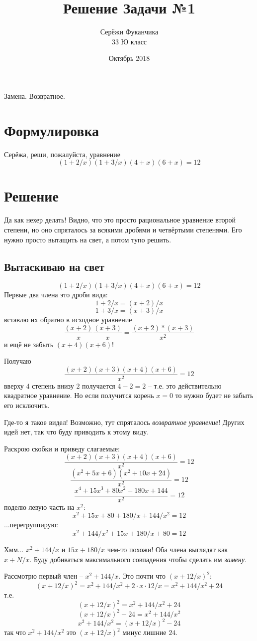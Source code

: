 \documentclass{article}
\title{Решение Задачи №1}
\author{Серёжи Фуканчика\\33 Ю класс}
\date{Октябрь 2018}
\begin{document}
\maketitle
Замена. Возвратное.
\section{Формулировка}
Серёжа, реши, пожалуйста, уравнение
$$(1+2/x)(1+3/x)(4+x)(6+x)=12$$

\section{Решение}

Да как нехер делать! Видно, что это просто рациональное уравнение второй степени, но оно спряталось за всякими дробями и четвёртыми степенями. Его нужно просто вытащить на свет, а потом тупо решить.

\subsection{Вытаскиваю на свет}
$$(1+2/x)(1+3/x)(4+x)(6+x)=12$$
Первые два члена это дроби вида:
$$1+2/x = (x+2)/x$$
$$1+3/x = (x+3)/x$$
вставлю их обратно в исходное уравнение
$$\frac{(x+2)}{x}\frac{(x+3)}{x}=\frac{(x+2)*(x+3)}{x^2}$$
и ещё не забыть $(x+4)(x+6)$!

Получаю
$$\frac{(x+2)(x+3)(x+4)(x+6)}{x^2}=12$$
вверху $4$ степень внизу $2$ получается $4-2=2$ -- т.е. это действительно квадратное уравнение.
Но если получится корень $x=0$ то нужно будет не забыть его исключить.

Где-то я такое видел! Возможно, тут спряталось \textit{возвратное уравнение}! Других идей нет, так что буду приводить к этому виду.

\begin{samepage}
Раскрою скобки и приведу слагаемые:
$$\frac{(x+2)(x+3)(x+4)(x+6)}{x^2}=12$$
$$\frac{(x^2+5x+6)(x^2+10x+24)}{x^2}=12$$
$$ \frac{x^4+15x^3+80x^2+180x+144}{x^2}=12 $$
поделю левую часть на $x^2$:
$$ x^2+15x+80+180/x+144/x^2=12 $$
...перегруппирую:
$$ x^2+144/x^2+15x+180/x+80=12 $$
\end{samepage}
Хмм... ${x^2+144/x}$ и ${15x+180/x}$ чем-то похожи! Оба члена выглядят как ${x+N/x}$. Буду добиваться максимального совпадения чтобы сделать им \textit{замену}.

\begin{samepage}
Рассмотрю первый член -- ${x^2+144/x}$. Это почти что ${(x+12/x)^2}$:
$$(x+12/x)^2=x^2+144/x^2+2 \cdot x \cdot 12/x=x^2+144/x^2+24 $$
т.е.
$$(x+12/x)^2=x^2+144/x^2+24$$
$$(x+12/x)^2-24=x^2+144/x^2$$
$$x^2+144/x^2=(x+12/x)^2-24$$
так что $ x^2+144/x^2$ это $(x+12/x)^2$ минус лишние $24$.
\end{samepage}
\end{document}
